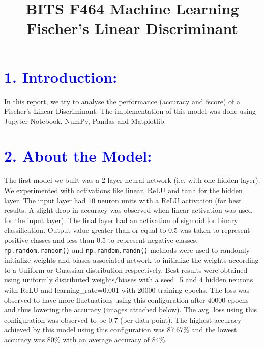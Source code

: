 \documentclass[a4paper,10pt,twoside]{article}
\title
{
\LARGE BITS F464 Machine Learning \\
\LARGE Fischer's Linear Discriminant
}
\date{}
\author{}
\begin{document}
\maketitle
\section*{\textcolor{blue}{1. Introduction:}}
In this report, we try to analyse the performance (accuracy and fscore) of a Fischer's Linear Discriminant. The implementation of this model was done using Jupyter Notebook, NumPy, Pandas and Matplotlib.

\section*{\textcolor{blue}{2. About the Model:}}
The first model we built was a 2-layer neural network (i.e. with one hidden layer). We experimented with activations like linear, ReLU and tanh for the hidden layer. The input layer had 10 neuron units with a ReLU activation (for best results. A slight drop in accuracy was observed when linear activation was used for the input layer). The final layer had an activation of sigmoid for binary classification. Output value greater than or equal to 0.5 was taken to represent positive classes and less than 0.5 to represent negative classes.
\texttt{np.random.random()} and \texttt{np.random.randn()} methods were used to randomly initialize weights and biases associated network to initialize the weights according to a Uniform or Guassian distribution respectively. Best results were obtained using uniformly distributed weights/biases with a seed=5 and 4 hidden neurons with ReLU and learning\_rate=0.001 with 20000 training epochs. The loss was observed to have more fluctuations using this configuration after 40000 epochs and thus lowering the accuracy (images attached below). The avg. loss using this configuration was observed to be 0.7 (per data point). The highest accuracy achieved by this model using this configuration was 87.67\% and the lowest accuracy was 80\% with an average accuracy of 84\%.
\end{document}
